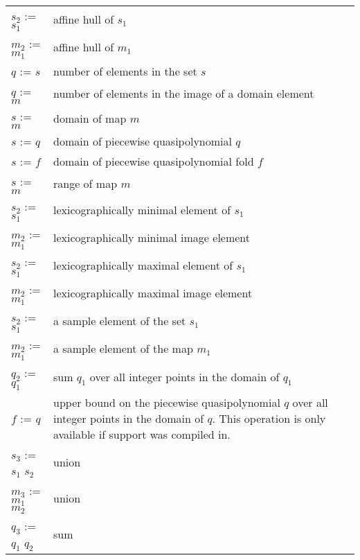\label{t:iscc}
\tablelasttail{}
\begin{supertabular}{lp{0.7\textwidth}}
$s_2$ :=  $s_1$ & affine hull of $s_1$
\\
$m_2$ :=  $m_1$ & affine hull of $m_1$
\\
$q$ :=  $s$ &
number of elements in the set $s$
\\
$q$ :=  $m$ &
number of elements in the image of a domain element
\\
$s$ :=  $m$ &
domain of map $m$
\\
$s$ :=  $q$ &
domain of piecewise quasipolynomial $q$
\\
$s$ :=  $f$ &
domain of piecewise quasipolynomial fold $f$
\\
$s$ :=  $m$ &
range of map $m$
\\
$s_2$ :=  $s_1$ &
lexicographically minimal element of $s_1$
\\
$m_2$ :=  $m_1$ &
lexicographically minimal image element
\\
$s_2$ :=  $s_1$ &
lexicographically maximal element of $s_1$
\\
$m_2$ :=  $m_1$ &
lexicographically maximal image element
\\
$s_2$ :=  $s_1$ &
a sample element of the set $s_1$
\\
$m_2$ :=  $m_1$ &
a sample element of the map $m_1$
\\
$q_2$ :=  $q_1$ &
sum $q_1$ over all integer points in the domain of $q_1$
\\
$f$ :=  $q$ &
upper bound on the piecewise quasipolynomial $q$ over
all integer points in the domain of $q$.
This operation is only available if
 support was compiled in.
\\
$s_3$ := $s_1$ \ai{$+$} $s_2$ & union
\\
$m_3$ := $m_1$ \ai{$+$} $m_2$ & union
\\
$q_3$ := $q_1$ \ai{$+$} $q_2$ & sum
\\

\end{supertabular}
